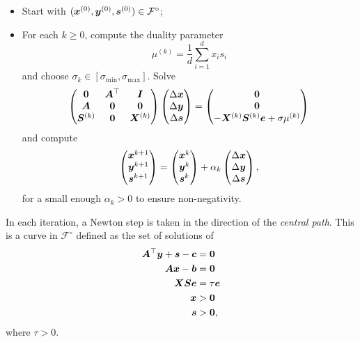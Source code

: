 \begin{itemize}
 \item Start with $(\bm{x}^{(0)},\bm{y}^{(0)},\bm{s}^{(0)})\in \mathcal{F}^{\circ}$;
 \item For each $k\geq 0$, compute the duality parameter
 \begin{equation*}
  \mu^{(k)} = \frac{1}{d} \sum_{i=1}^d x_is_i
 \end{equation*}
and choose $\sigma_k\in [\sigma_{\mathrm{min}},\sigma_{\mathrm{max}}]$. Solve
\begin{equation*}
 \begin{pmatrix}
  \bm{0} & \bm{A}^{\top} & \bm{I} \\
  \bm{A} & \bm{0} & \bm{0} \\
  \bm{S}^{(k)} & \bm{0} & \bm{X}^{(k)}
 \end{pmatrix}
\begin{pmatrix} \Delta\bm{x}\\ \Delta \bm{y}\\ \Delta\bm{s} \end{pmatrix} = \begin{pmatrix} \bm{0} \\ \bm{0} \\ -\bm{X}^{(k)}\bm{S}^{(k)}\bm{e}+\sigma \mu^{(k)}\end{pmatrix}
\end{equation*}
and compute
\begin{equation*}
\begin{pmatrix} \bm{x}^{k+1}\\ \bm{y}^{k+1}\\ \bm{s}^{k+1}\end{pmatrix}= \begin{pmatrix} \bm{x}^{k}\\ \bm{y}^{k}\\ \bm{s}^{k}\end{pmatrix} +\alpha_k \begin{pmatrix} \Delta\bm{x}\\ \Delta \bm{y}\\ \Delta\bm{s} \end{pmatrix},
 \end{equation*}
for a small enough $\alpha_k>0$ to ensure non-negativity.
\end{itemize}

In each iteration, a Newton step is taken in the direction of the {\em central path}. This is a curve in $\mathcal{F}^{\circ}$ defined as the set of solutions of
\begin{align}\label{eq:cpopt}
 \begin{split}
  \bm{A}^{\top}\bm{y}+\bm{s}-\bm{c} &= \bm{0}\\
  \bm{A}\bm{x}-\bm{b} & = \bm{0}\\
  \bm{X}\bm{S}\bm{e} &= \tau \bm{e}\\
  \bm{x}&> \bm{0}\\
  \bm{s}&> \bm{0},
 \end{split}
\end{align}
where $\tau>0$. 

